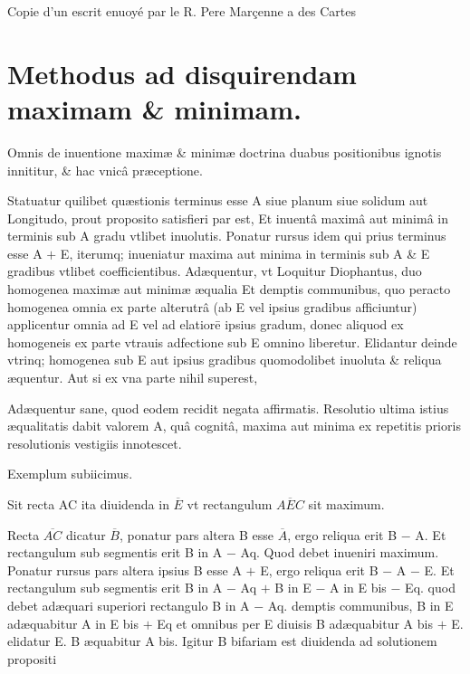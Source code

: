 \documentclass[11pt,a4paper]{article}
\begin{document}
Copie d'un escrit enuoyé par le R. Pere Marçenne a  des Cartes

\section*{Methodus ad disquirendam maximam \& minimam.}

Omnis de inuentione maximæ \& minimæ doctrina duabus positionibus ignotis innititur, \& hac vnicâ præceptione.

Statuatur quilibet quæstionis terminus esse A siue planum siue solidum aut Longitudo, prout proposito satisfieri par est, Et inuentâ maximâ aut minimâ in terminis sub A gradu vtlibet inuolutis. Ponatur rursus idem qui prius terminus esse A $+$ E, iterumq; inueniatur maxima aut minima in terminis sub A \& E gradibus vtlibet coefficientibus. Adæquentur, vt Loquitur Diophantus, duo homogenea maximæ aut minimæ æqualia Et demptis communibus, quo peracto homogenea omnia ex parte alterutrâ (ab E vel ipsius gradibus afficiuntur) applicentur omnia ad E vel ad elatiorē ipsius gradum, donec aliquod ex homogeneis ex parte vtrauis adfectione sub E omnino liberetur. Elidantur deinde vtrinq; homogenea sub E aut ipsius gradibus quomodolibet inuoluta \& reliqua æquentur. Aut si ex vna parte nihil superest,


Adæquentur sane, quod eodem recidit negata affirmatis. Resolutio ultima istius æqualitatis dabit valorem A, quâ cognitâ, maxima aut minima ex repetitis prioris resolutionis vestigiis innotescet.

Exemplum subiicimus.


Sit recta AC ita diuidenda in $\overline{E}$ vt rectangulum $\overline{AEC}$ sit maximum.

Recta $\overline{AC}$ dicatur $\overline{B}$, ponatur pars altera B esse $\overline{A}$, ergo reliqua erit B $-$ A. Et rectangulum sub segmentis erit B in A $-$ Aq. Quod debet inueniri maximum. Ponatur rursus pars altera ipsius B esse A $+$ E, ergo reliqua erit B $-$ A $-$ E. Et rectangulum sub segmentis erit B in A $-$ Aq $+$ B in E $-$ A in E bis $-$ Eq. quod debet adæquari superiori rectangulo B in A $-$ Aq. demptis communibus, B in E adæquabitur A in E bis $+$ Eq et omnibus per E diuisis B adæquabitur A bis $+$ E. elidatur E. B æquabitur A bis. Igitur B bifariam est diuidenda ad solutionem propositi
\end{document}
